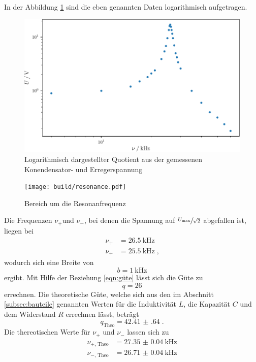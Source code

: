 In der Abbildung \ref{fig:frequence} sind die eben genannten Daten logarithmisch aufgetragen.
\begin{figure}
    \centering
    \caption{Logarithmisch dargestellter Quotient aus der gemessenen Konendensator- und Erregerspannung}
    \label{fig:frequence}
    \includegraphics{build/frequence.pdf}
\end{figure}
\begin{figure}
    \centering
    \caption{Bereich um die Resonanfrequenz}
    \label{fig:resonance}
    \texttt{[image: build/resonance.pdf]}
\end{figure}
\noindent Die Frequenzen $\nu_+ $und $\nu_-$, bei denen die Spannung auf $\sfrac{U_\text{max}}{\sqrt{2}}$ abgefallen ist, liegen bei
\begin{align*}
    \nu_+ &= \SI{26.5}{\kilo\hertz} \\
    \nu_+ &= \SI{25.5}{\kilo\hertz} \; \text{,}
\end{align*}
wodurch sich eine Breite von
\begin{equation*}
    b = \SI{1}{\kilo\hertz}
\end{equation*}
ergibt.
Mit Hilfe der Beziehung \eqref{eqn:güte} lässt sich die Güte zu 
\begin{equation*}
    q = 26
\end{equation*}
errechnen.
Die theoretische Güte, welche sich aus den im Abschnitt \ref{subsec:bauteile} genannten Werten für die Induktivität $L$, 
die Kapazität $C$ und dem Widerstand $R$ errechnen lässt, beträgt 
\begin{equation*}
    q_\text{Theo} = \num{42.41(64)} \; \text{.}
\end{equation*}
Die thereotischen Werte für $\nu_+ $ und $\nu_-$ lassen sich zu 
\begin{align*}
    \nu_{+\text{, Theo}} & = \SI{27.35(4)}{\kilo\hertz}\\
    \nu_{-\text{, Theo}} & = \SI{26.71(4)}{\kilo\hertz} 
\end{align*}
